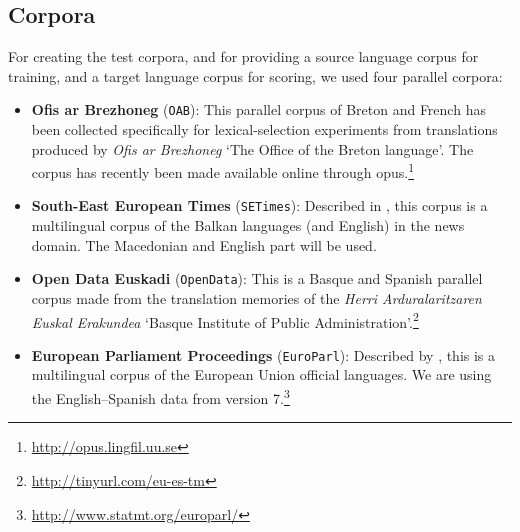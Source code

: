 \documentclass[11pt]{article}
\begin{document}
\subsection{Corpora}
\label{sec:eval-corpus}

For creating the test corpora, and for providing a source language corpus 
for training, and a target language corpus for scoring, we used four parallel corpora: 
\begin{itemize}
\addtolength{\itemsep}{-0.10in}
\item \textbf{Ofis ar Brezhoneg} (\texttt{OAB}): This parallel corpus
  of Breton and French has been collected specifically for
  lexical-selection experiments from translations produced by
  \emph{Ofis ar Brezhoneg} `The Office of the Breton
  language'. %
The corpus has recently been made available online through {\sc opus}.\footnote{\url{http://opus.lingfil.uu.se}}
\item \textbf{South-East European Times} (\texttt{SETimes}): Described
  in \cite{tyers10}, this corpus is a multilingual corpus of the
  Balkan languages (and English) in the news domain. The Macedonian and English
  part will be used.%
\item \textbf{Open Data Euskadi} (\texttt{OpenData}): This is a Basque
  and Spanish parallel corpus made from the translation memories of
  the \emph{Herri Arduralaritzaren Euskal Erakundea} `Basque Institute
  of Public
  Administration'.\footnote{\url{http://tinyurl.com/eu-es-tm}}
\item \textbf{European Parliament Proceedings} (\texttt{EuroParl}):
  Described by \cite{koehn05a}, this is a multilingual corpus of the
  European Union official languages. We are using the English--Spanish
  data from version 7.\footnote{\url{http://www.statmt.org/europarl/}}
\end{itemize}
\end{document}
